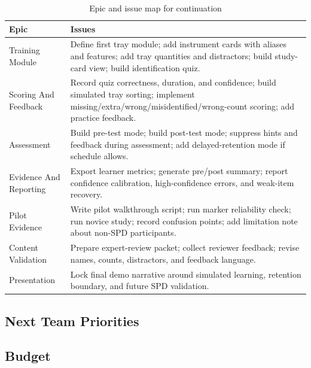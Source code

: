 \documentclass[10pt,a4paper]{article}
\begin{document}
\begin{table}[H]
\centering
\caption{Epic and issue map for continuation}
\label{tab:epic-and-issue-map-for-continuation}
\small\renewcommand{\arraystretch}{1.2}\setlength{\tabcolsep}{4pt}
\begin{tabularx}{\textwidth}{|>{\raggedright\arraybackslash}X|>{\raggedright\arraybackslash}X|}
\hline
Epic & Issues \\
\hline
Training Module & Define first tray module; add instrument cards with aliases and features; add tray quantities and distractors; build study-card view; build identification quiz. \\
\hline
Scoring And Feedback & Record quiz correctness, duration, and confidence; build simulated tray sorting; implement missing/extra/wrong/misidentified/wrong-count scoring; add practice feedback. \\
\hline
Assessment & Build pre-test mode; build post-test mode; suppress hints and feedback during assessment; add delayed-retention mode if schedule allows. \\
\hline
Evidence And Reporting & Export learner metrics; generate pre/post summary; report confidence calibration, high-confidence errors, and weak-item recovery. \\
\hline
Pilot Evidence & Write pilot walkthrough script; run marker reliability check; run novice study; record confusion points; add limitation note about non-SPD participants. \\
\hline
Content Validation & Prepare expert-review packet; collect reviewer feedback; revise names, counts, distractors, and feedback language. \\
\hline
Presentation & Lock final demo narrative around simulated learning, retention boundary, and future SPD validation. \\
\hline
\end{tabularx}
\end{table}
\subsection{Next Team Priorities}
\subsection{Budget}
\end{document}
